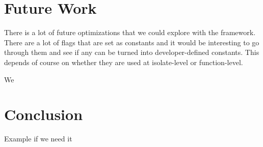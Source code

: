 \documentclass[twocolumn,showpacs,%
  nofootinbib,aps,superscriptaddress,%
  eqsecnum,prd,notitlepage,showkeys,10pt]{revtex4-1}
\begin{document}
\section{Future Work}
There is a lot of future optimizations that we could explore with the framework. There are a lot of flags that are set as constants and it would be interesting to go through them and see if any can be turned into developer-defined constants. This depends of course on whether they are used at isolate-level or function-level. 

We 
\section{Conclusion}







\begin{thebibliography}{9}

 Example if we need it





\end{thebibliography}
\end{document}
